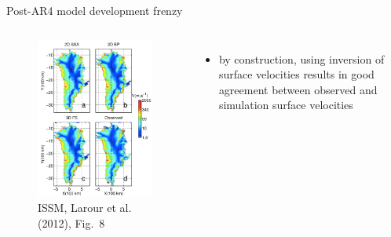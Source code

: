 \documentclass[hide notes,intlimits]{beamer}
\begin{document}
\begin{frame}{Post-AR4 model development frenzy}
  \vspace{-0.74em}
  \begin{columns}
    \column[c]{5.25cm}
    \begin{figure}
      \includegraphics[width=\textwidth]{larour-2012-fig8}
      \caption{ISSM, Larour et al. (2012), Fig.~8}
    \end{figure}
    \column[c]{7cm}
  \begin{itemize}
  \item by construction, using inversion of surface velocities results in good agreement between observed and simulation surface velocities
  \end{itemize}
  \end{columns}
\end{frame}
\end{document}
